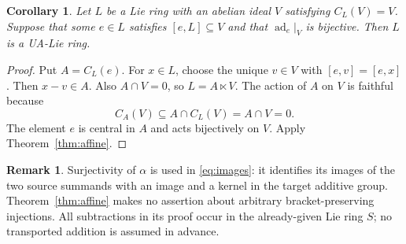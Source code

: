 \documentclass[11pt]{article}
\newtheorem{corollary}[theorem]{Corollary}
\theoremstyle{definition}
\newtheorem{remark}[theorem]{Remark}
\DeclareMathOperator{\ad}{ad}
\begin{document}
\begin{corollary}\label{cor:intrinsic}
Let $L$ be a Lie ring with an abelian ideal $V$ satisfying $C_L(V)=V$. Suppose that some $e\in L$ satisfies $[e,L]\subseteq V$ and that $\ad_e|_V$ is bijective. Then $L$ is a UA-Lie ring.
\end{corollary}
\begin{proof}
Put $A=C_L(e)$. For $x\in L$, choose the unique $v\in V$ with $[e,v]=[e,x]$. Then $x-v\in A$. Also $A\cap V=0$, so $L=A\ltimes V$. The action of $A$ on $V$ is faithful because
\[
 C_A(V)\subseteq A\cap C_L(V)=A\cap V=0.
\]
The element $e$ is central in $A$ and acts bijectively on $V$. Apply Theorem~\ref{thm:affine}.
\end{proof}

\begin{remark}
Surjectivity of $\alpha$ is used in \eqref{eq:images}: it identifies its images of the two source summands with an image and a kernel in the target additive group. Theorem~\ref{thm:affine} makes no assertion about arbitrary bracket-preserving injections. All subtractions in its proof occur in the already-given Lie ring $S$; no transported addition is assumed in advance.
\end{remark}
\end{document}
